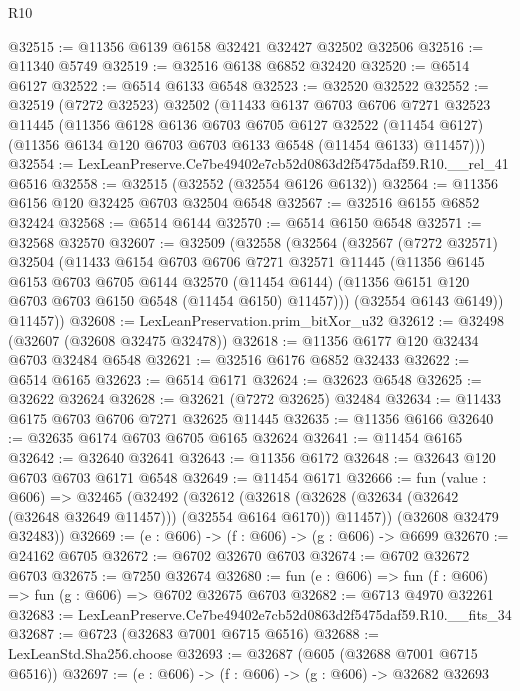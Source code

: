 \begin{lexlean}{R10}
\begin{coremodule}
@32515 := @11356 @6139 @6158 @32421 @32427 @32502 @32506
@32516 := @11340 @5749
@32519 := @32516 @6138 @6852 @32420
@32520 := @6514 @6127
@32522 := @6514 @6133 @6548
@32523 := @32520 @32522
@32552 := @32519
    (@7272 @32523)
    @32502
    (@11433
      @6137
      @6703
      @6706
      @7271
      @32523
      @11445
      (@11356
        @6128
        @6136
        @6703
        @6705
        @6127
        @32522
        (@11454 @6127)
        (@11356 @6134 @120 @6703 @6703 @6133 @6548 (@11454 @6133) @11457)))
@32554 := LexLeanPreserve.Ce7be49402e7cb52d0863d2f5475daf59.R10.__rel_41 @6516
@32558 := @32515 (@32552 (@32554 @6126 @6132))
@32564 := @11356 @6156 @120 @32425 @6703 @32504 @6548
@32567 := @32516 @6155 @6852 @32424
@32568 := @6514 @6144
@32570 := @6514 @6150 @6548
@32571 := @32568 @32570
@32607 := @32509
    (@32558
      (@32564
        (@32567
          (@7272 @32571)
          @32504
          (@11433
            @6154
            @6703
            @6706
            @7271
            @32571
            @11445
            (@11356
              @6145
              @6153
              @6703
              @6705
              @6144
              @32570
              (@11454 @6144)
              (@11356 @6151 @120 @6703 @6703 @6150 @6548 (@11454 @6150) @11457)))
          (@32554 @6143 @6149))
        @11457))
@32608 := LexLeanPreservation.prim_bitXor_u32
@32612 := @32498 (@32607 (@32608 @32475 @32478))
@32618 := @11356 @6177 @120 @32434 @6703 @32484 @6548
@32621 := @32516 @6176 @6852 @32433
@32622 := @6514 @6165
@32623 := @6514 @6171
@32624 := @32623 @6548
@32625 := @32622 @32624
@32628 := @32621 (@7272 @32625) @32484
@32634 := @11433 @6175 @6703 @6706 @7271 @32625 @11445
@32635 := @11356 @6166
@32640 := @32635 @6174 @6703 @6705 @6165 @32624
@32641 := @11454 @6165
@32642 := @32640 @32641
@32643 := @11356 @6172
@32648 := @32643 @120 @6703 @6703 @6171 @6548
@32649 := @11454 @6171
@32666 := fun (value : @606) =>
  @32465
    (@32492
      (@32612
        (@32618 (@32628 (@32634 (@32642 (@32648 @32649 @11457))) (@32554 @6164 @6170)) @11457))
      (@32608 @32479 @32483))
@32669 := (e : @606) -> (f : @606) -> (g : @606) -> @6699
@32670 := @24162 @6705
@32672 := @6702 @32670 @6703
@32674 := @6702 @32672 @6703
@32675 := @7250 @32674
@32680 := fun (e : @606) => fun (f : @606) => fun (g : @606) => @6702 @32675 @6703
@32682 := @6713 @4970 @32261
@32683 := LexLeanPreserve.Ce7be49402e7cb52d0863d2f5475daf59.R10.__fits_34
@32687 := @6723 (@32683 @7001 @6715 @6516)
@32688 := LexLeanStd.Sha256.choose
@32693 := @32687 (@605 (@32688 @7001 @6715 @6516))
@32697 := (e : @606) -> (f : @606) -> (g : @606) -> @32682 @32693

\end{coremodule}
\end{lexlean}
